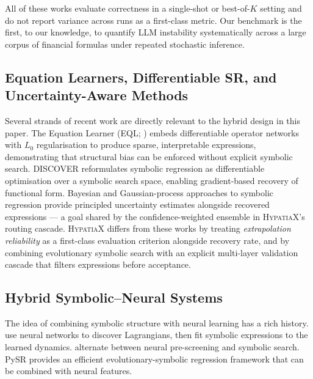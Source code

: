 \documentclass[twoside,11pt]{article}
\begin{document}
All of these works evaluate correctness in a single-shot or best-of-$K$ setting and
do not report variance across runs as a first-class metric.  Our benchmark is the
first, to our knowledge, to quantify LLM instability systematically across a large
corpus of financial formulas under repeated stochastic inference.

\subsection{Equation Learners, Differentiable SR, and Uncertainty-Aware Methods}\label{subsec:equation-learners-differentiable-sr-and-}
\label{sec:related_eq}

Several strands of recent work are directly relevant to the hybrid design in
this paper.  The Equation Learner (EQL; \citealt{sahoo2018eql}) embeds
differentiable operator networks with $L_0$ regularisation to produce sparse,
interpretable expressions, demonstrating that structural bias can be enforced
without explicit symbolic search.  DISCOVER \citep{liu2022discover} reformulates
symbolic regression as differentiable optimisation over a symbolic search space,
enabling gradient-based recovery of functional form.  Bayesian and
Gaussian-process approaches to symbolic regression \citep{jin2020bayesian}
provide principled uncertainty estimates alongside recovered expressions ---
a goal shared by the confidence-weighted ensemble in \textsc{HypatiaX}'s
routing cascade.  \textsc{HypatiaX} differs from these works by treating
\emph{extrapolation reliability} as a first-class evaluation criterion
alongside recovery rate, and by combining evolutionary symbolic search with an
explicit multi-layer validation cascade that filters expressions before
acceptance.

\subsection{Hybrid Symbolic--Neural Systems}\label{subsec:hybrid-symbolicneural-systems}
\label{sec:related_hybrid}

The idea of combining symbolic structure with neural learning has a rich history.
\citet{cranmer2020lagrangian} use neural networks to discover Lagrangians, then
fit symbolic expressions to the learned dynamics.  \citet{udrescu2020ai} alternate
between neural pre-screening and symbolic search.  PySR \citep{cranmer2023pysr}
provides an efficient evolutionary-symbolic regression framework that can be
combined with neural features.
\end{document}
